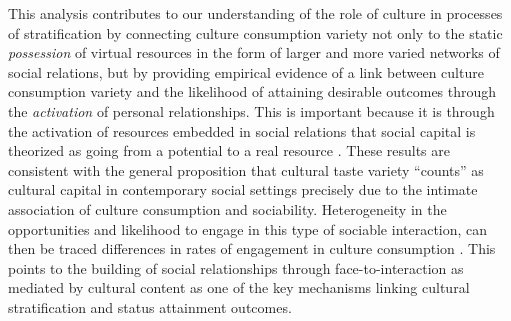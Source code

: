This analysis contributes to our understanding of the role of culture in processes of stratification by connecting culture consumption variety not only to the static \emph{possession} of virtual resources in the form of larger and more varied networks of social relations, but by providing empirical evidence of a link between culture consumption variety and the likelihood of attaining desirable outcomes through the \emph{activation} of personal relationships.  This is important because it is through the activation of resources embedded in social relations that social capital is theorized as going from a potential to a real resource \citep{lin99, lin01a}. These results are consistent with the general proposition that cultural taste variety ``counts'' as cultural capital in contemporary social settings precisely due to the intimate association of culture consumption and sociability.  Heterogeneity in the opportunities and likelihood to engage in this type of sociable interaction, can then be traced differences in rates of engagement in culture consumption \citep{witte_ryan04}.  This points to the building of social relationships through face-to-interaction as mediated by cultural content as one of the key mechanisms linking cultural stratification and status attainment outcomes.

